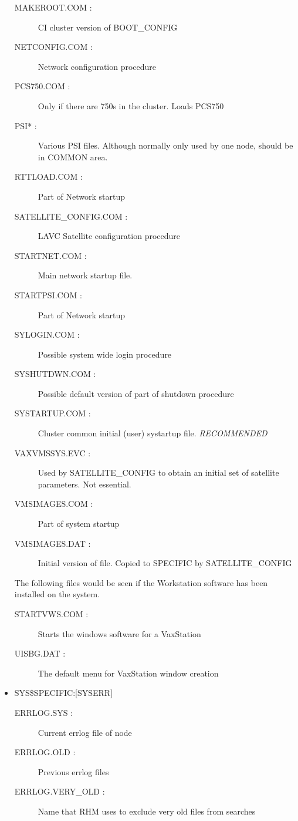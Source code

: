 \begin{itemize}
\begin{description}
\item [MAKEROOT.COM : ] CI cluster version of BOOT\_CONFIG
\item [NETCONFIG.COM : ] Network configuration procedure
\item [PCS750.COM : ] Only if there are 750s in the cluster. Loads PCS750
\item [PSI* : ] Various PSI files. Although normally only used by one node,
should be in COMMON area.
\item [RTTLOAD.COM : ] Part of Network startup
\item [SATELLITE\_CONFIG.COM : ] LAVC Satellite configuration procedure
\item [STARTNET.COM : ] Main network startup file.
\item [STARTPSI.COM : ] Part of Network startup
\item [SYLOGIN.COM : ] Possible system wide login procedure
\item [SYSHUTDWN.COM : ] Possible default version of part of shutdown procedure
\item [SYSTARTUP.COM : ] Cluster common initial (user) systartup file.
 {\em RECOMMENDED}
\item [VAXVMSSYS.EVC : ] Used by SATELLITE\_CONFIG to obtain an initial set of
satellite parameters. Not essential.
\item [VMSIMAGES.COM : ] Part of system startup
\item [VMSIMAGES.DAT : ] Initial version of file. Copied to SPECIFIC by
SATELLITE\_CONFIG
\end{description}
The following files would be seen if the Workstation software has been
installed on the system.
\begin{description}
\item [STARTVWS.COM : ] Starts the windows software for a VaxStation
\item [UISBG.DAT : ] The default menu for VaxStation window creation
\end{description}
\item {SYS\$SPECIFIC:[SYSERR]}
\begin{description}
\item [ERRLOG.SYS : ] Current errlog file of node
\item [ERRLOG.OLD : ] Previous errlog files
\item [ERRLOG.VERY\_OLD : ] Name that RHM uses to exclude very old files from
searches
\end{description}


\end{itemize}
